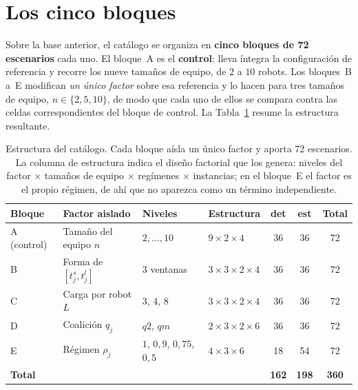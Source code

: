 \section{Los cinco bloques} \label{sec:casos-bloques}

Sobre la base anterior, el catálogo se organiza en \textbf{cinco bloques de 72 escenarios} cada uno. El bloque~A es el \textbf{control}: lleva íntegra la configuración de referencia y recorre los nueve tamaños de equipo, de $2$ a $10$ robots. Los bloques~B a~E modifican \emph{un único factor} sobre esa referencia y lo hacen para tres tamaños de equipo, $n \in \{2,5,10\}$, de modo que cada uno de ellos se compara contra las celdas correspondientes del bloque de control. La Tabla~\ref{tab:bloques} resume la estructura resultante.

\begin{table}[t]
\centering
\caption{Estructura del catálogo. Cada bloque aísla un único factor y aporta 72 escenarios. La columna de estructura indica el diseño factorial que los genera: niveles del factor $\times$ tamaños de equipo $\times$ regímenes $\times$ instancias; en el bloque~E el factor es el propio régimen, de ahí que no aparezca como un término independiente.}
\label{tab:bloques}
\begin{tabular}{llll ccc}
\hline
\textbf{Bloque} & \textbf{Factor aislado} & \textbf{Niveles} & \textbf{Estructura} & \textbf{det} & \textbf{est} & \textbf{Total} \\
\hline
A (control) & Tamaño del equipo $n$ & $2,\dots,10$          & $9\times 2\times 4$          & 36 & 36 & 72 \\
B & Forma de $[t_j^{s},t_j^{l}]$   & 3 ventanas            & $3\times 3\times 2\times 4$  & 36 & 36 & 72 \\
C & Carga por robot $L$            & $3$, $4$, $8$         & $3\times 3\times 2\times 4$  & 36 & 36 & 72 \\
D & Coalición $q_j$                & $q2$, $qm$            & $2\times 3\times 2\times 6$  & 36 & 36 & 72 \\
E & Régimen $\rho_j$               & $1$, $0{,}9$, $0{,}75$, $0{,}5$ & $4\times 3\times 6$ & 18 & 54 & 72 \\
\hline
\multicolumn{4}{l}{\textbf{Total}} & \textbf{162} & \textbf{198} & \textbf{360} \\
\hline
\end{tabular}
\end{table}

